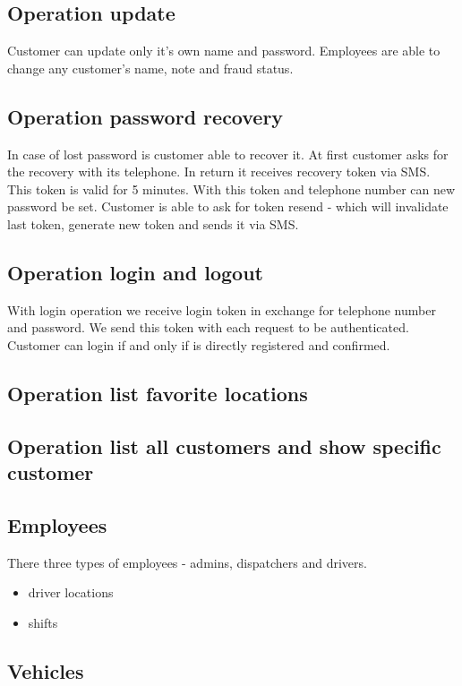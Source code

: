 \subsection{Operation update}
Customer can update only it's own name and password. Employees are able to change any customer's name, note and fraud status.
\subsection{Operation password recovery}
In case of lost password is customer able to recover it. At first customer asks for the recovery with its telephone. In return it receives recovery token via SMS. This token is valid for 5 minutes. With this token and telephone number can new password be set. Customer is able to ask for token resend - which will invalidate last token, generate new token and sends it via SMS.
\subsection{Operation login and logout}
With login operation we receive login token in exchange for telephone number and password. We send this token with each request to be authenticated.
Customer can login if and only if is directly registered and confirmed. 
\subsection{Operation list favorite locations}

\subsection{Operation list all customers and show specific customer}

\subsection{Employees}
There three types of employees - admins, dispatchers and drivers.
\begin{itemize}
	\item driver locations
	\item shifts
\end{itemize}
\subsection{Vehicles}

